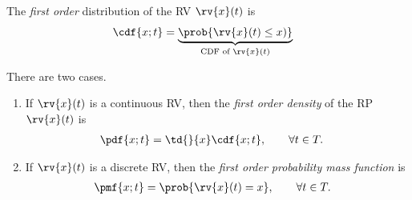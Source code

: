 \begin{definitionBox}
    The \emph{first order} distribution of the RV $\rv{x}(t)$ is  
    \begin{align}
        \cdf{x; t} &= \underbrace{\prob{\rv{x}(t) \leq x)}}_{\text{CDF of } \rv{x}(t)}
    \end{align}
\end{definitionBox}
\begin{definitionBox}
    There are two cases.
    \begin{enumerate}
        \item If $\rv{x}(t)$ is a continuous RV, then the \emph{first order density} of the RP $\rv{x}(t)$ is 
        \begin{align}
            \pdf{x; t} &= \td{}{x}\cdf{x; t}, \qquad \forall t\in T.
        \end{align}
            
        \item If $\rv{x}(t)$ is a discrete RV, then the \emph{first order probability mass function} is
        \begin{align}
            \pmf{x; t} &= \prob{\rv{x}(t) = x}, \qquad \forall t\in T.
        \end{align}
    \end{enumerate}
\end{definitionBox}

